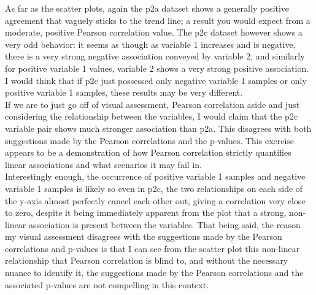 As far as the scatter plots, again the p2a dataset shows a generally positive agreement that vaguely sticks to the trend line; a result you would expect from a moderate, positive Pearson correlation value. The p2c dataset however shows a very odd behavior: it seems as though as variable 1 increases and is negative, there is a very strong negative association conveyed by variable 2, and similarly for positive variable 1 values, variable 2 shows a very strong positive association. I would think that if p2c just possessed only negative variable 1 samples or only positive variable 1 samples, these results may be very different.\\

If we are to just go off of visual assessment, Pearson correlation aside and just considering the relationship between the variables, I would claim that the p2c variable pair shows much stronger association than p2a. This disagrees with both suggestions made by the Pearson correlations and the p-values. This exercise appears to be a demonstration of how Pearson correlation strictly quantifies linear associations and what scenarios it may fail in.\\

Interestingly enough, the occurrence of positive variable 1 samples and negative variable 1 samples is likely so even in p2c, the two relationships on each side of the y-axis almost perfectly cancel each other out, giving a correlation very close to zero, despite it being immediately apparent from the plot that a strong, non-linear association is present between the variables. That being said, the reason my visual assessment disagrees with the suggestions made by the Pearson correlations and p-values is that I can see from the scatter plot this non-linear relationship that Pearson correlation is blind to, and without the necessary nuance to identify it, the suggestions made by the Pearson correlations and the associated p-values are not compelling in this context.

\newpage
